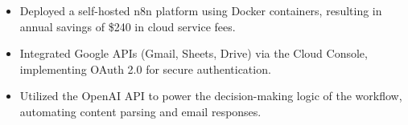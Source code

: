 \projectItem[
        title={Automated Invoice Generator and Responder Workflow},
        duration={},
        keyHighlight={Personal Project},
        location={Completed: June 2025}
    ]
    \begin{itemize}
        \vspace{-0.5em}
        \itemsep -6pt {}
        \item Deployed a self-hosted n8n platform using Docker containers, resulting in annual savings of \$240 in cloud service fees.
        \item Integrated Google APIs (Gmail, Sheets, Drive) via the Cloud Console, implementing OAuth 2.0 for secure authentication.
        \item Utilized the OpenAI API to power the decision-making logic of the workflow, automating content parsing and email responses.

    \end{itemize}